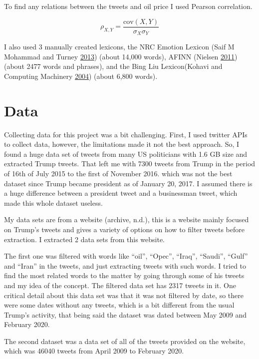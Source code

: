 \documentclass[]{article}
\begin{document}
To find any relations between the tweets and oil price I used Pearson
correlation.

\[  \rho_{X,Y}= \frac{\text{cov}(X,Y)}{\sigma_X\sigma_Y}\]

I also used 3 manually created lexicons, the NRC Emotion Lexicon (Saif M
Mohammad and Turney \protect\hyperlink{ref-mohammad_nrc_2013}{2013})
(about 14,000 words), AFINN (Nielsen
\protect\hyperlink{ref-nielsen_new_2011}{2011}) (about 2477 words and
phrases), and the Bing Liu Lexicon(Kohavi and Computing Machinery
\protect\hyperlink{ref-kohavi_kdd-2004_2004}{2004}) (about 6,800 words).

\section{Data}\label{data}

Collecting data for this project was a bit challenging. First, I used
twitter APIs to collect data, however, the limitations made it not the
best approach. So, I found a huge data set of tweets from many US
politicians with 1.6 GB size and extracted Trump tweets. That left me
with 7300 tweets from Trump in the period of 16th of July 2015 to the
first of November 2016. which was not the best dataset since Trump
became president as of January 20, 2017. I assumed there is a huge
difference between a president tweet and a businessman tweet, which made
this whole dataset useless.

My data sets are from a website (archive, n.d.), this is a website
mainly focused on Trump's tweets and gives a variety of options on how
to filter tweets before extraction. I extracted 2 data sets from this
website.

The first one was filtered with words like ``oil'', ``Opec'', ``Iraq'',
``Saudi'', ``Gulf'' and ``Iran'' in the tweets, and just extracting
tweets with such words. I tried to find the most related words to the
matter by going through some of his tweets and my idea of the concept.
The filtered data set has 2317 tweets in it. One critical detail about
this data set was that it was not filtered by date, so there were some
dates without any tweets, which is a bit different from the usual
Trump's activity, that being said the dataset was dated between May 2009
and February 2020.

The second dataset was a data set of all of the tweets provided on the
website, which was 46040 tweets from April 2009 to February 2020.
\end{document}
